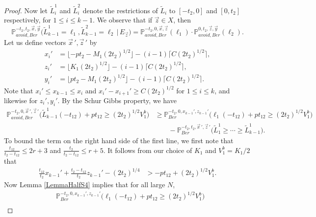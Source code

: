 \begin{proof}
	Now let $\tilde{L}_i^1$ and $\tilde{L}_i^2$ denote the restrictions of $\tilde{L}_i$ to $[-t_2,0]$ and $[0,t_2]$ respectively, for $1\leq i\leq k-1$. We observe that if $\vec{z}\in X$, then
	\begin{equation}\label{5.10split}
	\mathbb{P}^{-t_2,t_2,\vec{x},\vec{y}}_{avoid,Ber}\big(\tilde{L}^1_{k-1} = \ell_1, \tilde{L}^2_{k-1} = \ell_2 \, |\, E_{\vec{z}}\big) = \mathbb{P}^{-t_2,0,\vec{x},\vec{z}}_{avoid,Ber}(\ell_1)\cdot\mathbb{P}^{0,t_2,\vec{z},\vec{y}}_{avoid,Ber}(\ell_2).
	\end{equation}
	Let us define vectors $\vec{x}\,', \vec{z}\,'$ by
	\begin{align*}
	x_i' &= \lfloor -pt_2 - M_1(2t_2)^{1/2}\rfloor - (i-1)\lceil C(2t_2)^{1/2}\rceil,\\
	z_i' &= \lfloor K_1(2t_2)^{1/2}\rfloor - (i-1)\lceil C(2t_2)^{1/2}\rceil,\\
	y_i' &= \lfloor pt_2 - M_1(2t_2)^{1/2}\rfloor - (i-1)\lceil C(2t_2)^{1/2}\rceil.
	\end{align*}
	Note that $x_i' \leq x_{k-1} \leq x_i$ and $x_i' - x_{i+1}' \geq C(2t_2)^{1/2}$ for $1\leq i\leq k$, and likewise for $z_i',y_i'$. By the Schur Gibbs property, we have
	\begin{equation}\label{5.10separate}
	\begin{split}
	\mathbb{P}^{-t_2,0,\vec{x}\,',\vec{z}\,'}_{avoid,Ber}\Big(\tilde{L}^1_{k-1}(-t_{12}) + pt_{12} \geq (2t_2)^{1/2}V_1^b\Big) &\geq \mathbb{P}^{-t_2,0,x_{k-1}',z_{k-1}'}_{Ber}\Big(\ell_1(-t_{12}) + pt_{12} \geq (2t_2)^{1/2}V_1^b\Big)\\
	&\qquad - \mathbb{P}^{-t_2,t_2,\vec{x}\,',\vec{z}\,'}_{Ber}\big(\tilde{L}^1_1 \geq \cdots \geq \tilde{L}_{k-1}^1\big).
	\end{split}
	\end{equation} 
	To bound the term on the right hand side of the first line, we first note that $\frac{t_{12}}{t_2-t_{12}} \leq 2r+3$ and $\frac{t_2}{t_2-t_{12}} \leq r+5$. It follows from our choice of $K_1$ and $V_1^b = K_1/2$ that 
	\begin{align*}
	\frac{t_{12}}{t_2}x_{k-1}' + \frac{t_2-t_{12}}{t_2}z_{k-1}' - (2t_2)^{1/4} &> -pt_{12} + (2t_2)^{1/2}V_1^b.
	\end{align*}
	Now Lemma \ref{LemmaHalfS4} implies that for all large $N$,
	\begin{equation}\label{5.10third}
	\begin{split}
	&\mathbb{P}^{-t_2,0,x_{k-1}',z_{k-1}'}_{Ber}\Big(\ell_1(-t_{12}) + pt_{12} \geq (2t_2)^{1/2}V_1^b\Big)\\

\end{split}
\end{equation}
\end{proof}
